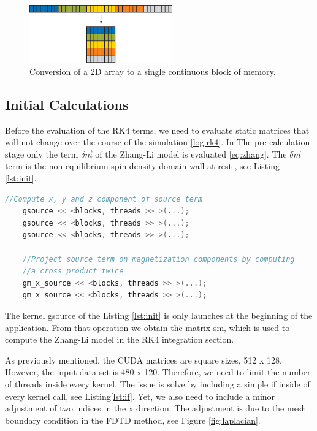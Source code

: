 \begin{figure}[htbp]
	\centering
		\includegraphics[width=0.55\textwidth]{Figures/flaten.png}
		\smallskip
	\caption[2D flatten array]{Conversion of a 2D array to a single continuous block of memory.}
	\label{fig:flaten}
\end{figure}


\subsection{Initial Calculations}

Before the evaluation of the RK4 terms, we need to evaluate static matrices that will not change over the course of the simulation \ref{log:rk4}. In The pre calculation stage only the term $ \delta \vec{m}$ of the Zhang-Li model is evaluated \ref{eq:zhang}. The $ \delta \vec{m}$ term is the non-equilibrium spin density domain wall at rest \cite{claudio}, see Listing \ref{lst:init}.

\begin{lstlisting}[language=C++, label={lst:init}, caption={Initial calculations.}]
	//Compute x, y and z component of source term
    gsource << <blocks, threads >> >(...);
    gsource << <blocks, threads >> >(...);
    gsource << <blocks, threads >> >(...);

    //Project source term on magnetization components by computing
    //a cross product twice
    gm_x_source << <blocks, threads >> >(...);
    gm_x_source << <blocks, threads >> >(...);
\end{lstlisting}

The kernel {\listf gsource} of the Listing \ref{lst:init} is only launches at the beginning of the application. From that operation we obtain the matrix {\listf sm}, which is used to compute the Zhang-Li model in the RK4 integration section.

As previously mentioned, the CUDA matrices are square sizes, 512 x 128. However, the input data set is 480 x 120. Therefore, we need to limit the number of threads inside every kernel. The issue is solve by including a simple {\listf if} inside of every kernel call, see Listing\ref{lst:if}. Yet, we also need to include a minor adjustment of two indices in the x direction. The adjustment is due to the mesh boundary condition in the FDTD method, see Figure \ref{fig:laplacian}.

